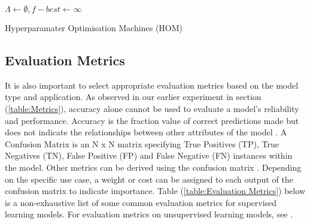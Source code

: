 \begin{algorithm}[H]
    \SetAlgoLined
    $\Lambda \leftarrow \emptyset, f-{best} \leftarrow \infty$\\

    
    \caption{Hyperparamater Optimisation Machines (HOM) }%
\end{algorithm}

\subsection{Evaluation Metrics}
It is also important to select appropriate evaluation metrics based on the model type and application.
As observed in our earlier experiment in section (\ref{table:Metrics}), accuracy alone cannot be used to evaluate a model's reliability and performance.
Accuracy is the fraction value of correct predictions made but does not indicate the relationships between other attributes of the model \cite{8320256}.
A Confusion Matrix is an N x N matrix specifying True Positives (TP), True Negatives (TN), False Positive (FP) and False Negative (FN) instances within the model.
Other metrics can be derived using the confusion matrix \cite{8320256}.
Depending on the specific use case, a weight or cost can be assigned to each output of the confusion matrix to indicate importance.
Table (\ref{table:Evaluation Metrics}) below is a non-exhaustive list of some common evaluation metrics for supervised learning models.
For evaluation metrics on unsupervised learning models, see \cite{palacioniño2019evaluation}.

